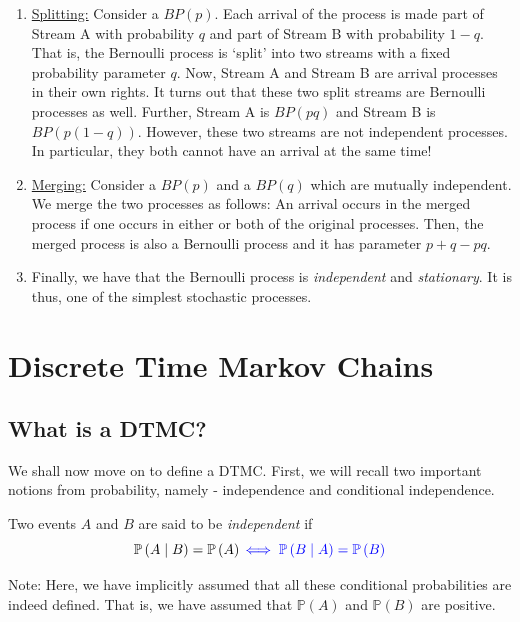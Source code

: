 \documentclass[12pt]{article}
\def\P{\mathbb{P}}
\theoremstyle{definition}
\begin{document}
\begin{enumerate}
    \item \underline{Splitting:} Consider a $BP(p)$. Each arrival of the process is made part of Stream A with probability $q$ and part of Stream B with probability $1-q$. That is, the Bernoulli process is `split' into two streams with a fixed probability parameter $q$. Now, Stream A and Stream B are arrival processes in their own rights. It turns out that these two split streams are Bernoulli processes as well. Further, Stream A is $BP(pq)$ and Stream B is $BP(p(1-q))$. However, these two streams are not independent processes. In particular, they both cannot have an arrival at the same time!
    
    \item \underline{Merging:} Consider a $BP(p)$ and a $BP(q)$ which are mutually independent. We merge the two processes as follows: An arrival occurs in the merged process if one occurs in either or both of the original processes. Then, the merged process is also a Bernoulli process and it has parameter $p+q-pq$.
    
    \item Finally, we have that the Bernoulli process is \emph{independent} and \emph{stationary}. It is thus, one of the simplest stochastic processes. 
\end{enumerate}

\newpage\section{Discrete Time Markov Chains}

\subsection{What is a DTMC?}

We shall now move on to define a DTMC. First, we will recall two important notions from probability, namely - independence and conditional independence. 

\begin{defn}[Independence]
    Two events $A$ and $B$ are said to be \emph{independent} if 
    \[
        \P \left( A \mid B \right) = \P \left( A \right) \textcolor{blue}{\iff \P \left( B \mid A \right) = \P \left( B \right)}
    \]
\end{defn}
Note: Here, we have implicitly assumed that all these conditional probabilities are indeed defined. That is, we have assumed that $\P(A)$ and $\P(B)$ are positive.
\end{document}
